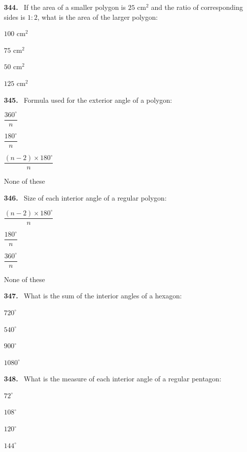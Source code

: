 \documentclass[11pt]{article}
\newenvironment{qenv}[1]{%
  \par\medskip\noindent\textbf{#1.}\ \ignorespaces
}{\par}
\begin{document}
\begin{qenv}{344} If the area of a smaller polygon is $25$ cm$^2$ and the ratio of corresponding sides is $1:2$, what is the area of the larger polygon:
\begin{options} \item $100$ cm$^2$ \item $75$ cm$^2$ \item $50$ cm$^2$ \item $125$ cm$^2$ \end{options} \end{qenv}

\begin{qenv}{345} Formula used for the exterior angle of a polygon:
\begin{options} \item $\dfrac{360^{\circ}}{n}$ \item $\dfrac{180^{\circ}}{n}$ \item $\dfrac{(n-2)\times180^{\circ}}{n}$ \item None of these \end{options} \end{qenv}

\begin{qenv}{346} Size of each interior angle of a regular polygon:
\begin{options} \item $\dfrac{(n-2)\times180^{\circ}}{n}$ \item $\dfrac{180^{\circ}}{n}$ \item $\dfrac{360^{\circ}}{n}$ \item None of these \end{options} \end{qenv}

\begin{qenv}{347} What is the sum of the interior angles of a hexagon:
\begin{options} \item $720^{\circ}$ \item $540^{\circ}$ \item $900^{\circ}$ \item $1080^{\circ}$ \end{options} \end{qenv}

\begin{qenv}{348} What is the measure of each interior angle of a regular pentagon:
\begin{options} \item $72^{\circ}$ \item $108^{\circ}$ \item $120^{\circ}$ \item $144^{\circ}$ \end{options} \end{qenv}
\end{document}
